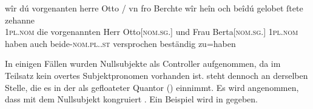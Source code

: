 \begin{exe}
\ex \label{ex:cao_diffgend_11_beide}
		\gll wîr dú vorgenanten herre Otto / vn fro Berchte
				\textelp{} wîr heîn och beîdú \textelp{}
				gelobet ſtete zehanne \\
			\textsc{1pl\subMF.nom} die vorgenannten Herr
				Otto[\textsc{nom.sg.\MascM}] {} und Frau
				Berta[\textsc{nom.sg.\FemF}] {} \textsc{1pl\subMF.nom} haben
				auch beide-\textsc{nom.pl.\NeutMF.st} {} versprochen beständig
				zu=haben \\
		\trans {}
			\parencites(Nr.~2931, Basel, 1298)[223,1--6]{cao4}

\end{exe}

\label{phsec:vbctrl}
In einigen Fällen wurden Nullsubjekte als Controller
aufgenommen, da im Teilsatz kein overtes Subjektpronomen vorhanden ist.
 steht dennoch an derselben Stelle, die es in der
 als gefloateter Quantor
() einnimmt. Es wird angenommen, dass  mit
dem Nullsubjekt kongruiert \autocites[siehe
auch][419]{dalrymple2001}[210]{bresnanetal2016}. Ein Beispiel wird in
 gegeben.

